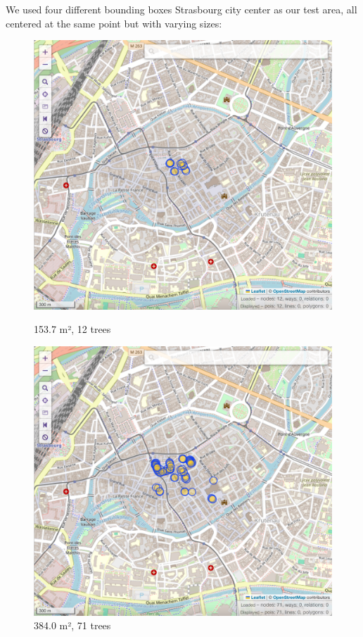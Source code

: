 \documentclass[12pt]{article}
\begin{document}
We used four different bounding boxes Strasbourg city center as our test area, 
all centered at the same point but with
varying sizes:

\begin{figure}[H]
    \centering
    \begin{minipage}{0.45\textwidth}
        \centering
        \includegraphics[width=\textwidth]{images/ovt-bbox1.png}
        \caption{153.7 m², 12 trees}
    \end{minipage}\hfill
    \begin{minipage}{0.45\textwidth}
        \centering
        \includegraphics[width=\textwidth]{images/ovt-bbox2.png}
        \caption{384.0 m², 71 trees}
    \end{minipage}
\end{figure}
\end{document}
